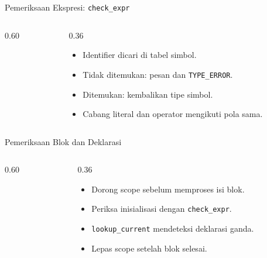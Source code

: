 \documentclass[aspectratio=169,10pt,t]{beamer}
\begin{document}
\begin{frame}[fragile]{Pemeriksaan Ekspresi: \texttt{check\_expr}}
  \begin{columns}[T,onlytextwidth]
    \begin{column}{0.60\textwidth}
      
    \end{column}
    \begin{column}{0.36\textwidth}
      \begin{itemize}
        \item Identifier dicari di tabel simbol.
        \item Tidak ditemukan: pesan dan \texttt{TYPE\_ERROR}.
        \item Ditemukan: kembalikan tipe simbol.
        \item Cabang literal dan operator mengikuti pola sama.
      \end{itemize}
    \end{column}
  \end{columns}
\end{frame}

\begin{frame}[fragile]{Pemeriksaan Blok dan Deklarasi}
  \begin{columns}[T,onlytextwidth]
    \begin{column}{0.60\textwidth}
      
    \end{column}
    \begin{column}{0.36\textwidth}
      \begin{itemize}
        \item Dorong scope sebelum memproses isi blok.
        \item Periksa inisialisasi dengan \texttt{check\_expr}.
        \item \texttt{lookup\_current} mendeteksi deklarasi ganda.
        \item Lepas scope setelah blok selesai.
      \end{itemize}
    \end{column}
  \end{columns}
\end{frame}
\end{document}
